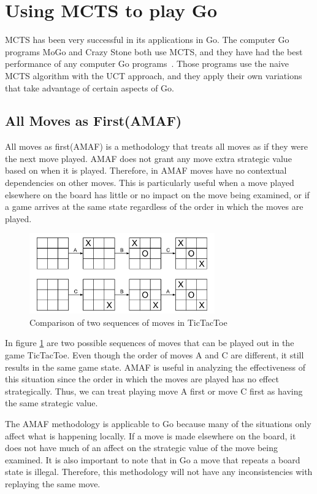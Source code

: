 \documentclass{sig-alternate}
\begin{document}
\section{Using MCTS to play Go}

MCTS has been very successful in its applications in Go. The computer Go programs MoGo and Crazy Stone both use MCTS, and they have had the best performance of any computer Go programs~\cite{RAVEinGo}. Those programs use the naive MCTS algorithm with the UCT approach, and they apply their own variations that take advantage of certain aspects of Go.

\subsection{All Moves as First(AMAF)}
All moves as first(AMAF) is a methodology that treats all moves as if they were the next move played. AMAF does not grant any move extra strategic value based on when it is played. Therefore, in AMAF moves have no contextual dependencies on other moves. This is particularly useful when a move played elsewhere on the board has little or no impact on the move being examined, or if a game arrives at the same state regardless of the order in which the moves are played. 

\begin{figure}[h]
	\includegraphics[width=8cm]{MoveOrderNotMattering.pdf}
	\centering
	\caption{Comparison of two sequences of moves in TicTacToe}
	\label{fig:TwoSeq}
\end{figure}

In figure \ref{fig:TwoSeq} are two possible sequences of moves that can be played out in the game TicTacToe. Even though the order of moves A and C are different, it still results in the same game state. AMAF is useful in analyzing the effectiveness of this situation since the order in which the moves are played has no effect strategically. Thus, we can treat playing move A first or move C first as having the same strategic value.

The AMAF methodology is applicable to Go because many of the situations only affect what is happening locally. If a move is made elsewhere on the board, it does not have much of an affect on the strategic value of the move being examined. It is also important to note that in Go a move that repeats a board state is illegal. Therefore, this methodology will not have any inconsistencies with replaying the same move.
\end{document}

